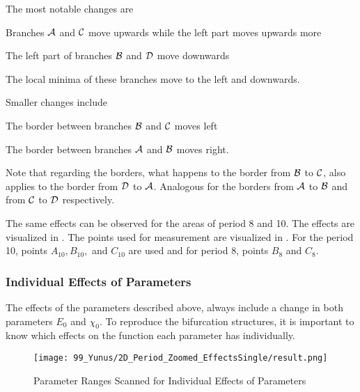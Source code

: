 The most notable changes are
\begin{enumerate*}
    \item Branches $\mathcal{A}$ and $\mathcal{C}$ move upwards while the left part moves upwards more
    \item The left part of branches $\mathcal{B}$ and $\mathcal{D}$ move downwards 
    \item The local minima of these branches move to the left and downwards.
\end{enumerate*}
Smaller changes include
\begin{enumerate*}
    \item The border between branches $\mathcal{B}$ and $\mathcal{C}$ moves left
    \item The border between branches $\mathcal{A}$ and $\mathcal{B}$ moves right.
\end{enumerate*}
Note that regarding the borders, what happens to the border from $\mathcal{B}$ to $\mathcal{C}$, also applies to the border from $\mathcal{D}$ to $\mathcal{A}$.
Analogous for the borders from $\mathcal{A}$ to $\mathcal{B}$ and from $\mathcal{C}$ to $\mathcal{D}$ respectively.

The same effects can be observed for the areas of period 8 and 10.
The effects are visualized in .
The points used for measurement are visualized in .
For the period 10, points $A_{10}, B_{10},$ and $C_{10}$ are used and for period 8, points $B_8$ and $C_8$.

\subsubsection{Individual Effects of Parameters}

The effects of the parameters described above, always include a change in both parameters $E_0$ and $\chi_0$.
To reproduce the bifurcation structures, it is important to know which effects on the function each parameter has individually.

\begin{figure}
    \centering
    \texttt{[image: 99\_Yunus/2D\_Period\_Zoomed\_EffectsSingle/result.png]}
    \label{fig:yunus.function.evolution.single.map}
    \caption{Parameter Ranges Scanned for Individual Effects of Parameters}
\end{figure}

